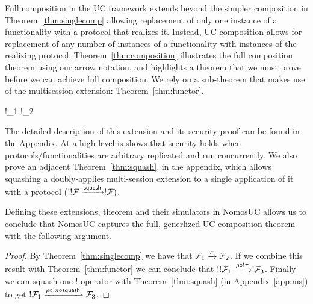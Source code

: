 Full composition in the UC framework extends beyond the simpler composition in Theorem~\ref{thm:singlecomp} allowing replacement of only one instance of a functionality with a protocol that realizes it.
Instead, UC composition allows for replacement of any number of instances of a functionality with instances of the realizing protocol.
Theorem~\ref{thm:composition} illustrates the full composition theorem using our arrow notation, and highlights a theorem that we must prove before we can achieve full composition.
We rely on a sub-theorem that makes use of the multisession extension: Theorem~\ref{thm:functor}.
\begin{theorem}\label{thm:functor}
	\begin{mathpar}
		{
			!\F_1 \xrightarrow{!\pi} !\F_2
		}
	\end{mathpar}
\end{theorem}
The detailed description of this extension and its security proof can be found in the Appendix. At a high level is shows that security holds when protocols/functionalities are arbitrary replicated and run concurrently.
We also prove an adjacent Theorem~\ref{thm:squash}, in the appendix, which allows squashing a doubly-applies multi-session extension to a single application of it with a  protocol ($!!\mathcal{F} \xrightarrow{{\mathsf {squash}}} !\mathcal{F})$.

Defining these extensions, theorem and their simulators in NomosUC allows us to conclude that NomosUC captures the full, generlized UC composition theorem with the following argument. 

\begin{proof}
By Theorem~\ref{thm:singlecomp} we have that $\mathcal{F}_1 \xrightarrow{\pi} \mathcal{F}_2$. If we combine this result with Theorem~\ref{thm:functor} we can conclude that $!!\mathcal{F}_1 \xrightarrow{\rho \circ !\pi} !\mathcal{F}_3$. 
Finally we can squash one $!$ operator with Theorem~\ref{thm:squash} (in Appendix~\ref{app:ms}) to get $!\mathcal{F}_1 \xrightarrow{\rho \circ !\pi \circ \mathsf{squash}} \mathcal{F}_3$.
\end{proof}


